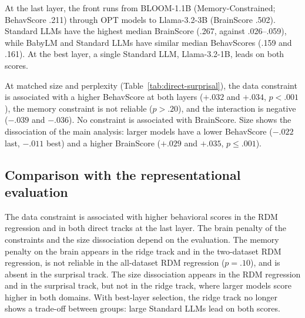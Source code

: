 

At the last layer, the front runs from BLOOM-1.1B (Memory-Constrained; BehavScore .211) through OPT models to Llama-3.2-3B (BrainScore .502). Standard LLMs have the highest median BrainScore (.267, against .026--.059), while BabyLM and Standard LLMs have similar median BehavScores (.159 and .161). At the best layer, a single Standard LLM, Llama-3.2-1B, leads on both scores.

At matched size and perplexity (Table~\ref{tab:direct-surprisal}), the data constraint is associated with a higher BehavScore at both layers ($+.032$ and $+.034$, $p<.001$), the memory constraint is not reliable ($p>.20$), and the interaction is negative ($-.039$ and $-.036$). No constraint is associated with BrainScore. Size shows the dissociation of the main analysis: larger models have a lower BehavScore ($-.022$ last, $-.011$ best) and a higher BrainScore ($+.029$ and $+.035$, $p\leq.001$).

\subsection{Comparison with the representational evaluation}
\label{app:direct-summary}

The data constraint is associated with higher behavioral scores in the RDM regression and in both direct tracks at the last layer. The brain penalty of the constraints and the size dissociation depend on the evaluation. The memory penalty on the brain appears in the ridge track and in the two-dataset RDM regression, is not reliable in the all-dataset RDM regression ($p=.10$), and is absent in the surprisal track. The size dissociation appears in the RDM regression and in the surprisal track, but not in the ridge track, where larger models score higher in both domains. With best-layer selection, the ridge track no longer shows a trade-off between groups: large Standard LLMs lead on both scores.
